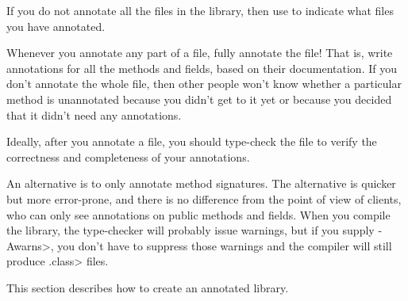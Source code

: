 
If you do not annotate all the files in the library, then use
 to indicate what files you have
annotated.

Whenever you annotate any part of a file, fully annotate the file!  That
is, write annotations for all the methods and fields, based on their
documentation.  If you don't annotate the whole file, then other people
won't know whether a particular method is unannotated because you didn't
get to it yet or because you decided that it didn't need any annotations.



Ideally, after you annotate a file, you should type-check the file to verify
the correctness and completeness of your annotations.

An alternative is to
only annotate method signatures.  The alternative is quicker but more
error-prone, and there is no difference from the point of view of clients,
who can only see annotations on public methods and fields.  When you
compile the library, the type-checker will probably issue warnings, but if
you supply \<-Awarns>, you don't have to suppress those warnings and the
compiler will still produce \<.class> files.



This section describes how to create an annotated library.

